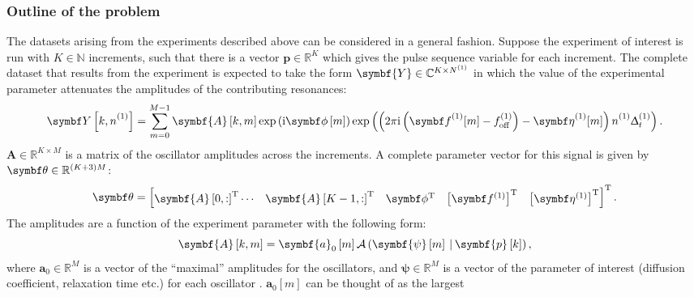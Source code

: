 
\subsubsection{Outline of the problem}
The datasets arising from the experiments described above can be considered in
a general fashion.
Suppose the experiment of interest is run with $K \in \mathbb{N}$ increments,
such that there is a vector  $\symbf{p} \in \mathbb{R}^K$ which gives the
pulse sequence variable for each increment.
The complete dataset that results from the experiment is expected to take the
form $\symbf{Y} \in \mathbb{C}^{K \times \None}$ in which the value of the
experimental parameter attenuates the amplitudes of the contributing
resonances:
\begin{equation}
    \bY\left[k, \none\right] = \sum_{m=0}^{M-1} \symbf{A}\left[k, m\right]  \exp\left(\iu \bdphim \right)
    \exp\left(\left(2 \pi \iu \left(\bdfone_{\vphantom{\text{off}}} [m] -
    \foffone\right) - \bdetaone_{\vphantom{\text{off}}} [m] \right) \none
\Dtone\right).
\end{equation}
$\symbf{A} \in \mathbb{R}^{K \times M}$ is a matrix of the oscillator amplitudes
across the increments. A complete parameter vector for this
signal is given by $\bth \in \mathbb{R}^{(K + 3)M}$:
\begin{equation}
    \bth =
    \begin{bmatrix}
        \symbf{A}\left[0, :\right]\T \cdots & \symbf{A}\left[K-1, :\right]\T &
        \bdphi\T & \left[\bdfone\right]\T & \left[\bdetaone\right]\T
    \end{bmatrix}\T.
\end{equation}
The amplitudes are a function of the experiment parameter with the following
form:
\begin{equation}
    \symbf{A}\left[k, m\right] =
        \symbf{a}_0 \left[m\right]
        \mathcal{A} \left(
            \symbf{\psi}\left[m\right] \hspace*{2pt} | \hspace*{2pt}
            \symbf{p}\left[k\right]
        \right),
\end{equation}
where $\symbf{a}_0 \in \mathbb{R}^{M}$ is a vector of the ``maximal''
amplitudes for the oscillators, and $\symbf{\psi} \in \mathbb{R}^M$ is a vector
of the parameter of interest (diffusion coefficient, relaxation time etc.) for
each oscillator . $\symbf{a}_0 [m]$ can be thought of as the largest
